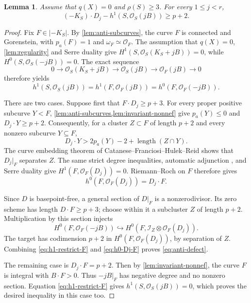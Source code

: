\documentclass[11pt,reqno]{amsart}
\numberwithin{equation}{section}
\newtheorem{lemma}[lemma]{Lemma}
\theoremstyle{remark}
\newcommand{\sshf}[1]{\mathcal{O}_{#1}}
\newcommand{\ses}[3]{0\rightarrow#1\rightarrow#2\rightarrow#3\rightarrow{0}}
\newcommand{\is}[1]{\mathscr I_{#1}}
\newcommand{\pa}{p_a}
\begin{document}
\begin{lemma}
\label{lem:anti-defect}
Assume that \(q(X)=0\) and \(\rho(S)\geq3\). For every
\(1\leq j<r\),
\begin{equation}\label{eq:anti-defect}
 (-K_S)\cdot D_j-h^1(S,\sshf{S}(jB))\geq p+2.
\end{equation}
\end{lemma}

\begin{proof}
Fix \(F\in|-K_S|\). By \cref{lem:anti-subcurves}, the curve \(F\)
is connected and Gorenstein, with \(\pa(F)=1\) and
\(\omega_F\simeq\sshf{F}\). The assumption that $q(X)=0$, \cref{lem:regularity} and Serre duality give
\(H^1(S,\sshf{S}(K_S+jB))=0\), while
\(H^0(S,\sshf{S}(-jB))=0\).
The exact sequence
\[\ses{\sshf{S}(K_S+jB)}{\sshf{S}(jB)}{\sshf{F}(jB)}\]
therefore yields
\begin{equation}\label{eq:h1-restrict-F}
 h^1(S,\sshf{S}(jB))=h^1(F,\sshf{F}(jB))
 =h^0(F,\sshf{F}(-jB)).
\end{equation}

There are two cases. Suppose first that \(F\cdot D_j\geq p+3\).
For every proper positive subcurve \(Y<F\),
\cref{lem:anti-subcurves,lem:invariant-nonnef} give
\(\pa(Y)\leq0\) and \(D_j\cdot Y\geq p+2\).
Consequently, for a cluster \(Z\subset F\) of length \(p+2\) and
every nonzero subcurve \(Y\subseteq F\),
\[
 D_j\cdot Y>2\pa(Y)-2+\operatorname{length}(Z\cap Y).
\]
The curve embedding theorem of Catanese--Franciosi--Hulek--Reid
\cite[Theorem 1.1]{CFHR} shows that \(D_j|_F\) separates \(Z\).
The same strict degree inequalities, automatic adjunction
\cite[Lemma 2.4]{CFHR}, and Serre duality give
\(H^1(F,\sshf{F}(D_j))=0\).
Riemann--Roch on \(F\) therefore gives
\begin{equation}\label{eq:h0-Dj-F}
 h^0(F,\sshf{F}(D_j))=D_j\cdot F.
\end{equation}

Since \(D\) is basepoint-free, a general section of \(D|_F\) is a
nonzerodivisor. Its zero scheme has length \(D\cdot F\geq p+3\);
choose within it a subcluster \(Z\) of length \(p+2\).
Multiplication by this section injects
\[
 H^0(F,\sshf{F}(-jB))\hookrightarrow
 H^0(F,\is{Z}\otimes\sshf{F}(D_j)).
\]
The target has codimension \(p+2\) in
\(H^0(F,\sshf{F}(D_j))\), by separation
of \(Z\). Combining \eqref{eq:h1-restrict-F} and
\eqref{eq:h0-Dj-F} proves \eqref{eq:anti-defect}.

The remaining case is \(D_j\cdot F=p+2\).
Then by \cref{lem:invariant-nonnef}, the curve \(F\) is integral with
\(B\cdot F>0\). Thus \(-jB|_F\) has negative degree and no nonzero
section. Equation \eqref{eq:h1-restrict-F} gives
\(h^1(S,\sshf{S}(jB))=0\),
which proves the desired inequality in this case too.
\end{proof}
\end{document}
